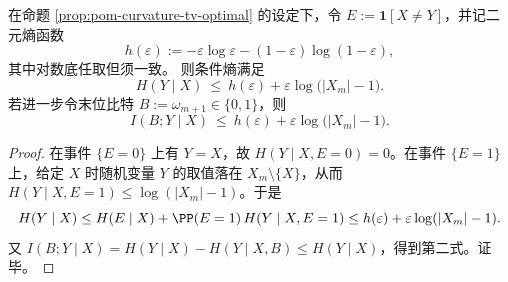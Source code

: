 \begin{proposition}[曲率门槛对信息注入的可审计上界]\label{prop:pom-curvature-conditional-entropy-bound}
在命题 \ref{prop:pom-curvature-tv-optimal} 的设定下，令 $E:=\mathbf 1[X\neq Y]$，并记二元熵函数
\[
h(\varepsilon):=-\varepsilon\log\varepsilon-(1-\varepsilon)\log(1-\varepsilon),
\]
其中对数底任取但须一致。
则条件熵满足
\[
H(Y\mid X)\ \le\ h(\varepsilon)+\varepsilon\log\bigl(|X_m|-1\bigr).
\]
若进一步令末位比特 $B:=\omega_{m+1}\in\{0,1\}$，则
\[
I(B;Y\mid X)\ \le\ h(\varepsilon)+\varepsilon\log\bigl(|X_m|-1\bigr).
\]
\end{proposition}
\begin{proof}
在事件 $\{E=0\}$ 上有 $Y=X$，故 $H(Y\mid X,E=0)=0$。在事件 $\{E=1\}$ 上，给定 $X$ 时随机变量 $Y$ 的取值落在 $X_m\setminus\{X\}$，从而 $H(Y\mid X,E=1)\le \log(|X_m|-1)$。于是
\[
H(Y\mid X)\le H(E\mid X)+\PP(E=1)\,H(Y\mid X,E=1)
\le h(\varepsilon)+\varepsilon\log(|X_m|-1).
\]
又 $I(B;Y\mid X)=H(Y\mid X)-H(Y\mid X,B)\le H(Y\mid X)$，得到第二式。证毕。
\end{proof}


